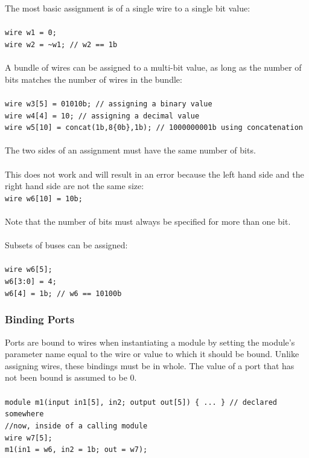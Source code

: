 \documentclass[letterpaper,11pt]{article}
\begin{document}
        The most basic assignment is of a single wire to a single bit value: \\\\
        \texttt{wire w1 = 0;}  \\
        \texttt{wire w2 = \textasciitilde w1;     // w2 == 1b}\\\\
        A bundle of wires can be assigned to a multi-bit value, as long as the number of bits matches 
        the number of wires in the bundle: \\\\
        \texttt{wire w3[5] = 01010b;	 // assigning a binary value} \\
        \texttt{wire w4[4] = 10;       // assigning a decimal value} \\
        \texttt{wire w5[10] = concat(1b,8\{0b\},1b);	// 1000000001b using concatenation} \\\\
		The two sides of an assignment must have the same number of bits. \\\\        
        This does not work and will result in an error because the left hand side and the right hand 
        side are not the same size:\\
        \texttt{wire w6[10] = 10b;} \\\\
        Note that the number of bits must always be specified for more than one bit. \\\\
        Subsets of buses can be assigned: \\\\
        \texttt{wire w6[5];} \\
        \texttt{w6[3:0] = 4;} \\ 
        \texttt{w6[4] = 1b; // w6 == 10100b} \\ 
        \subsubsection{Binding Ports}
        Ports are bound to wires when instantiating a module by setting the module’s parameter name 
        equal to the wire or value to which it should be bound. Unlike assigning wires, these bindings 
        must be in whole. The value of a port that has not been bound 
        is assumed to be 0. \\\\
        \texttt{module m1(input in1[5], in2; output out[5]) \{ ... \} // declared somewhere} \\
        \texttt{\slash\slash now, inside of a calling module} \\
        \texttt{wire w7[5];} \\
        \texttt{m1(in1 = w6, in2 = 1b; out = w7);}
    
\end{document}
